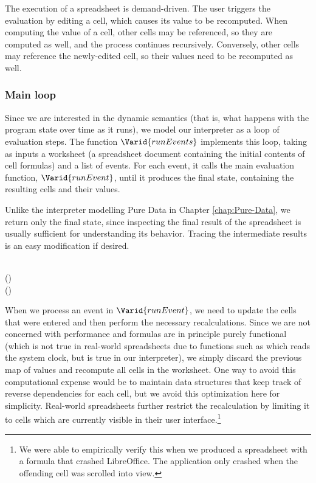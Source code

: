 The execution of a spreadsheet is demand-driven. The user triggers the
evaluation by editing a cell, which causes its value to be recomputed. When
computing the value of a cell, other cells may be referenced, so they are
computed as well, and the process continues recursively. Conversely,
other cells may reference the newly-edited cell, so their values need
to be recomputed as well.

\subsubsection{Main loop}

Since we are interested in the dynamic semantics (that is, what happens with
the program state over time as it runs), we model our interpreter as a loop of
evaluation steps. The function \ensuremath{\Varid{runEvents}} implements this loop, taking as
inputs a worksheet (a spreadsheet document containing the initial contents of
cell formulas) and a list of events. For each event, it calls the main
evaluation function, \ensuremath{\Varid{runEvent}}, until it produces the final state, containing
the resulting cells and their values.

Unlike the interpreter modelling Pure Data in Chapter \ref{chap:Pure-Data}, we
return only the final state, since inspecting the final result of the
spreadsheet is usually sufficient for understanding its behavior. Tracing the
intermediate results is an easy modification if desired.

\begin{hscode}\SaveRestoreHook
{}%
%
%
\>[B]{}\mathbin{::}\to {}\<[E]%
\\
\>[B]{}\;(\;)\;\mathrel{=}{}\<[E]%
\\
\>[B]{}\<[4]%
\>[4]{}\;\;(\;\;)\;\<[E]%
\ColumnHook
\end{hscode}\resethooks

When we process an event in \ensuremath{\Varid{runEvent}}, we need to update the cells that were
entered and then perform the necessary recalculations. Since we are not
concerned with performance and formulas are in principle purely functional
(which is not true in real-world spreadsheets due to functions such as 
which reads the system clock, but is true in our interpreter), we simply
discard the previous map of values and recompute all cells in the worksheet.
One way to avoid this computational expense would be to maintain data
structures that keep track of reverse dependencies for each cell, but we avoid
this optimization here for simplicity. Real-world spreadsheets further
restrict the recalculation by limiting it to cells which are currently visible
in their user interface.\footnote{We were able to empirically verify this when
we produced a spreadsheet with a formula that crashed LibreOffice. The
application only crashed when the offending cell was scrolled into view.}

